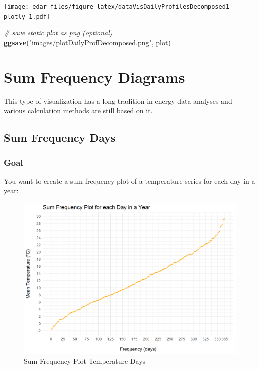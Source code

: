 \documentclass[
  a4paperpaper,
]{book}
\newenvironment{Shaded}{\begin{snugshade}}{\end{snugshade}}
\newcommand{\CommentTok}[1]{\textcolor[rgb]{0.56,0.35,0.01}{\textit{#1}}}
\newcommand{\KeywordTok}[1]{\textcolor[rgb]{0.13,0.29,0.53}{\textbf{#1}}}
\newcommand{\NormalTok}[1]{#1}
\newcommand{\StringTok}[1]{\textcolor[rgb]{0.31,0.60,0.02}{#1}}
\let\oldShaded\Shaded
\let\endoldShaded\endShaded
\renewenvironment{Shaded}{\footnotesize\oldShaded}{\endoldShaded}
\begin{document}
\texttt{[image: edar\_files/figure-latex/dataVisDailyProfilesDecomposed1 plotly-1.pdf]}

\begin{Shaded}
\begin{Highlighting}[]
\CommentTok{# save static plot as png (optional)}
\KeywordTok{ggsave}\NormalTok{(}\StringTok{"images/plotDailyProfDecomposed.png"}\NormalTok{, plot)}
\end{Highlighting}
\end{Shaded}

\hypertarget{sum-frequency-diagrams}{%
\chapter{Sum Frequency Diagrams}\label{sum-frequency-diagrams}}

This type of visualization has a long tradition in energy data analyses and various calculation methods are still based on it.

\newpage

\hypertarget{sum-frequency-days}{%
\section{Sum Frequency Days}\label{sum-frequency-days}}

\hypertarget{goal-16}{%
\subsection{Goal}\label{goal-16}}

You want to create a sum frequency plot of a temperature series for each day in a year:

\begin{figure}
\includegraphics[width=0.7\linewidth]{images/plotSumFrequencyDays} \caption{Sum Frequency Plot Temperature Days}\label{fig:unnamed-chunk-25}
\end{figure}
\end{document}
